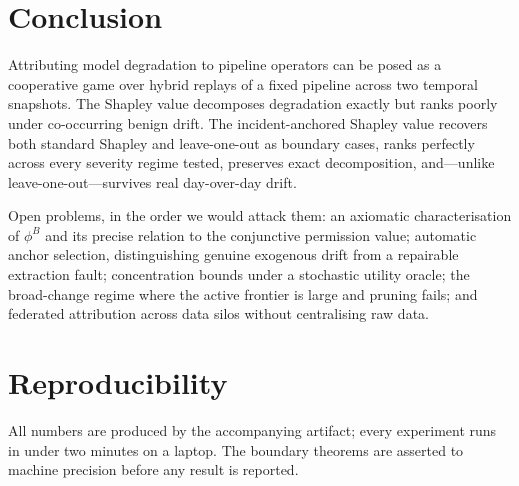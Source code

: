 \documentclass[conference]{IEEEtran}
\begin{document}
\section{Conclusion}\label{sec:conclusion}

Attributing model degradation to pipeline operators can be posed as a cooperative
game over hybrid replays of a fixed pipeline across two temporal snapshots. The
Shapley value decomposes degradation exactly but ranks poorly under co-occurring
benign drift. The incident-anchored Shapley value recovers both standard Shapley
and leave-one-out as boundary cases, ranks perfectly across every severity regime
tested, preserves exact decomposition, and---unlike leave-one-out---survives real
day-over-day drift.

Open problems, in the order we would attack them: an axiomatic characterisation
of $\phi^B$ and its precise relation to the conjunctive permission value;
automatic anchor selection, distinguishing genuine exogenous drift from a
repairable extraction fault; concentration bounds under a stochastic utility
oracle; the broad-change regime where the active frontier is large and pruning
fails; and federated attribution across data silos without centralising raw data.

\section*{Reproducibility}

All numbers are produced by the accompanying artifact; every experiment runs in
under two minutes on a laptop. The boundary theorems are asserted to machine
precision before any result is reported.
\end{document}
